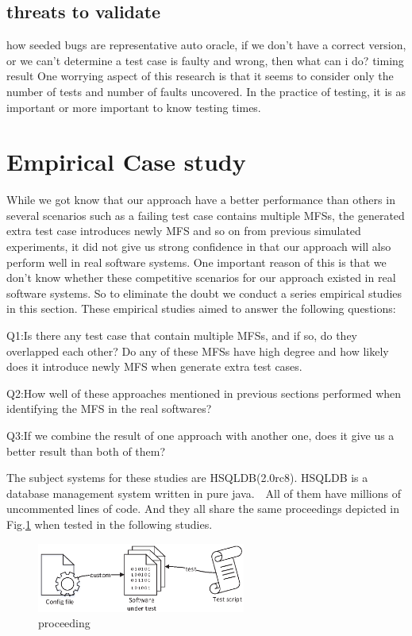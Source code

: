 \documentclass[10pt,journal,cspaper,compsoc]{IEEEtran}
\begin{document}
\subsection{threats to validate}
how seeded bugs are representative
auto oracle, if we don't have a correct version, or we can't determine a test case is faulty and wrong, then what can i do?
timing result
One worrying aspect of this research is that it seems to consider only the number of tests and number of faults uncovered. In the practice of testing, it is as important or more important to know testing times.

\section{Empirical Case study}
 While we got know that our approach have a better performance than others in several scenarios such as a failing test case contains multiple MFSs, the generated extra test case introduces newly MFS and so on from previous simulated experiments, it did not give us strong confidence in that our approach will also perform well in real software systems. One important reason of this is that we don't know whether these competitive scenarios for our approach existed in real software systems. So to eliminate the doubt we conduct a series empirical studies in this section. These empirical studies aimed to answer the following questions:

 Q1:Is there any test case that contain multiple MFSs, and if so, do they overlapped each other? Do any of these MFSs have high degree and how likely does it introduce newly MFS when generate extra test cases.

 Q2:How well of these approaches mentioned in previous sections performed when identifying the MFS in the real softwares?

 Q3:If we combine the result of one approach with another one, does it give us a better result than both of them?

The subject systems for these studies are HSQLDB(2.0rc8). HSQLDB is a database management system written in pure java.　All of them have millions of uncommented lines of code. And they all share the same proceedings depicted in Fig.\ref{proceeding} when tested in the following studies.
\begin{figure}
 \centering
 \includegraphics[width=2.7in]{proceed.eps}
 \caption{proceeding}
 \label{proceeding}
\end{figure}
\end{document}
